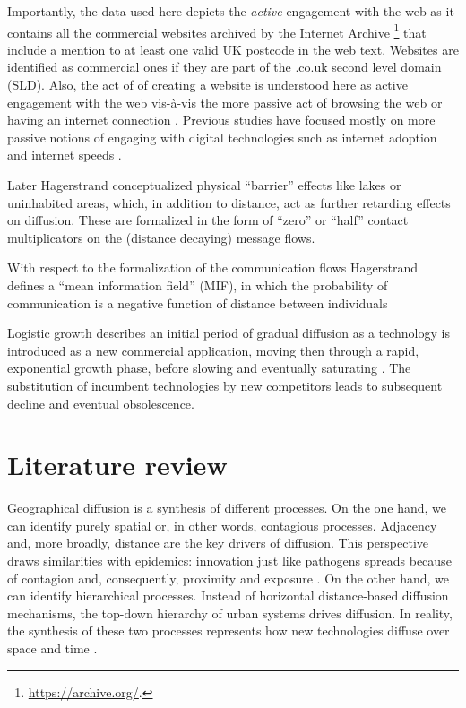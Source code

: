 \documentclass[
  authoryear,
  preprint,
  3p]{elsarticle}
\begin{document}
Importantly, the data used here depicts the \emph{active} engagement
with the web as it contains all the commercial websites archived by the
Internet Archive \footnote{\href{See\%20https://archive.org/}{https://archive.org/}.}
that include a mention to at least one valid UK postcode in the web
text. Websites are identified as commercial ones if they are part of the
.co.uk second level domain (SLD). Also, the act of of creating a website
is understood here as active engagement with the web vis-à-vis the more
passive act of browsing the web or having an internet connection
\citep{tranosuk}. Previous studies have focused mostly on more passive
notions of engaging with digital technologies such as internet adoption
and internet speeds
\citep[e.g.][]{blank2018local, riddlesden2014broadband}.

\citet{grubler1990rise} Later Hagerstrand conceptualized physical
``barrier'' effects like lakes or uninhabited areas, which, in addition
to distance, act as further retarding effects on diffusion. These are
formalized in the form of ``zero'' or ``half'' contact multiplicators on
the (distance decaying) message flows.

\citet{grubler1990rise} With respect to the formalization of the
communication flows Hagerstrand defines a ``mean information field''
(MIF), in which the probability of communication is a negative function
of distance between individuals

\citet{wilson201281} Logistic growth describes an initial period of
gradual diffusion as a technology is introduced as a new commercial
application, moving then through a rapid, exponential growth phase,
before slowing and eventually saturating \citep{grubler1999dynamics}.
The substitution of incumbent technologies by new competitors leads to
subsequent decline and eventual obsolescence.

\hypertarget{sec2}{%
\section{Literature review}\label{sec2}}

Geographical diffusion is a synthesis of different processes. On the one
hand, we can identify purely spatial or, in other words, contagious
processes. Adjacency and, more broadly, distance are the key drivers of
diffusion. This perspective draws similarities with epidemics:
innovation just like pathogens spreads because of contagion and,
consequently, proximity and exposure \citep{hivner2003facilitating}. On
the other hand, we can identify hierarchical processes. Instead of
horizontal distance-based diffusion mechanisms, the top-down hierarchy
of urban systems drives diffusion. In reality, the synthesis of these
two processes represents how new technologies diffuse over space and
time \citep{morrill2020spatial}.
\end{document}

